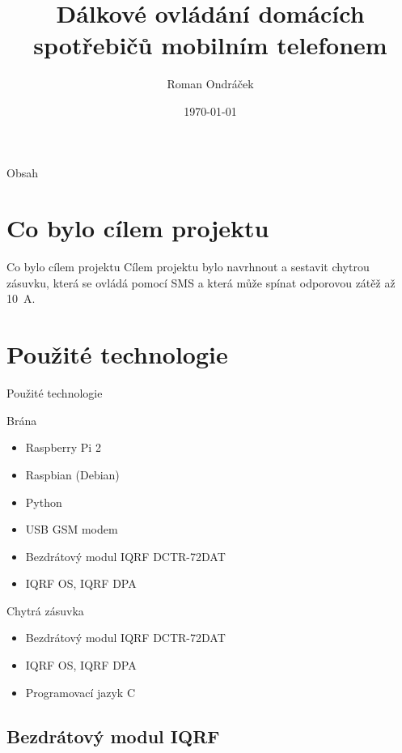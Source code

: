 \documentclass[11pt]{beamer}
\author{Roman Ondráček}
\title[Dálkové ovládání domácích spotřebičů]{Dálkové ovládání domácích spotřebičů mobilním telefonem}
\institute[]{Gymnázium Boskovice}
\date{\today}
\begin{document}
\begin{frame}
\titlepage
\end{frame}

\begin{frame}{Obsah}
\tableofcontents
\end{frame}

\section{Co bylo cílem projektu}

\begin{frame}{Co bylo cílem projektu}
Cílem projektu bylo navrhnout a sestavit chytrou zásuvku, která se ovládá pomocí SMS a která může spínat odporovou zátěž až 10~A.
\end{frame}

\section{Použité technologie}

\begin{frame}{Použité technologie}
  \begin{exampleblock}{Brána}
    \begin{itemize}
      \item Raspberry Pi 2
      \item Raspbian (Debian)
      \item Python
      \item USB GSM modem
      \item Bezdrátový modul IQRF DCTR-72DAT
      \item IQRF OS, IQRF DPA
    \end{itemize}
  \end{exampleblock}
  \begin{alertblock}{Chytrá zásuvka}
    \begin{itemize}
      \item Bezdrátový modul IQRF DCTR-72DAT
      \item IQRF OS, IQRF DPA
      \item Programovací jazyk C
    \end{itemize}
  \end{alertblock}
\end{frame}

\subsection{Bezdrátový modul IQRF}
\end{document}

